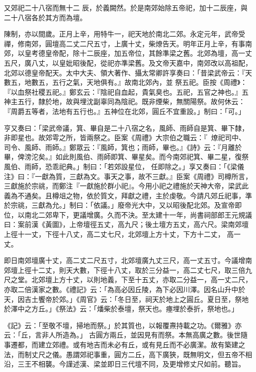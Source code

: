 \begin{pinyinscope}
 又郊祀二十八宿而無十二
 辰，於義闕然。於是南郊始除五帝祀，加十二辰座，與二十八宿各於其方而為壇。



 陳制，亦以間歲。正月上辛，用特牛一，祀天地於南北二郊。永定元年，武帝受禪，修南郊，圓壇高二丈二尺五寸，上廣十丈，柴燎告天。明年正月上辛，有事南郊，以皇考德皇帝配，除十二辰座，加五帝位，其餘準梁之舊。北郊為壇，高一丈五尺，廣八丈，以皇妣昭後配，從祀亦準梁舊。及文帝天嘉中，南郊改以高祖配，北郊以德皇帝配天。太中大夫、領大著作、攝太常卿許享奏曰：「昔梁武帝云：『天數五，地數五，五行之氣，天地俱有。』故南北郊內，並
 祭五祀。臣按《周禮》：『以血祭社稷五祀。』鄭玄云：『陰祀自血起，貴氣臭也。五祀，五官之神也。』五神主五行，隸於地，故與埋沈副辜同為陰祀。既非煙柴，無關陽祭。故何休云：『周爵五等者，法地有五行也。』五神位在北郊，圓丘不宜重設。」制曰：「可。」



 亨又奏曰：「梁武帝議，箕、畢自是二十八宿之名，風師、雨師自是箕、畢下隸，非即星也。故郊雩之所，皆兩祭之。臣案《周禮》大宗伯之職云：『燎祀司中、司令、風師、雨師。』鄭眾云：『風師，箕也；雨師，畢也。』《詩》云：『月離於畢，俾滂沱矣。』如此則風伯、雨師即箕、畢星矣。而今南郊祀箕、畢二星，復祭風伯、雨師，恐乖祀典。」制曰：「若郊設星位，
 任即除之。」享又奏曰：「《梁儀注》曰：『一獻為質，三獻為文。事天之事，故不三獻。』臣案《周禮》司樽所言，三獻施於宗祧，而鄭注『一獻施於群小祀』。今用小祀之禮施於天神大帝，梁武此義為不通矣。且樽俎之物，依於質文，拜獻之禮，主於虔敬。今請凡郊丘祀事，準於宗祧，三獻為允。」制曰：「依議。」廢帝光大中，又以昭後配北郊。及宣帝即位，以南北二郊卑下，更議增廣。久而不決。至太建十一年，尚書祠部郎王元規議曰：案前漢《黃圖》，上帝壇徑五丈，高九尺；後土壇方五丈，高六尺。梁南郊壇上徑十一丈，下徑十八丈，高二丈七尺，北郊壇上方十丈，下方十二丈，
 高一丈。



 即日南郊壇廣十丈，高二丈二尺五寸，北郊壇廣九丈三尺，高一丈五寸。今議增南郊壇上徑十二丈，則天大數，下徑十八丈，取於三分益一，高二丈七尺，取三倍九尺之堂。北郊壇上方十丈，以則地義，下至十五丈，亦取二分益一，高一丈二尺，亦取二倍漢家之數。《禮記》云：「為高必因丘陵，為下必因川澤。因名山升中於天，因吉土饗帝於郊。」《周官》云：「冬日至，祠天於地上之圓丘。夏日至，祭地於澤中之方丘。」《祭法》云：「燔柴於泰壇，祭天也。瘞埋於泰折，祭地也。」



 《記》云：「至敬不壇，掃地而祭。」於其質也，以報覆燾持載之功。《爾雅》亦云：「丘，言非人所造為。」
 古圓方兩丘，並因見有而祭。本無高廣之數。後世隨事遷都，而建立郊禮。或有地吉而未必有丘，或有見丘而不必廣潔。故有築建之法，而制丈尺之儀。愚謂郊祀事重，圓方二丘，高下廣狹，既無明文，但五帝不相沿，三王不相襲。今謹述漢、梁並即日三代壇不同，及更增修丈尺如前。聽旨。




\end{pinyinscope}
